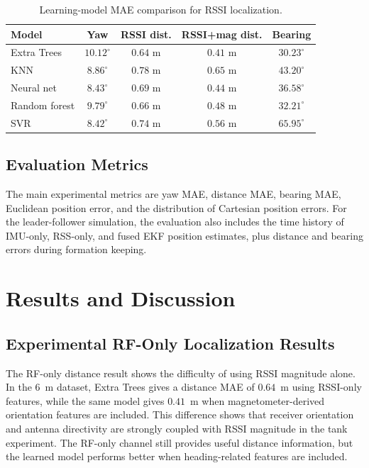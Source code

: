 \documentclass{uhcoethesis}
\begin{document}
\begin{table}[t]
    \centering
    \caption{Learning-model MAE comparison for RSSI localization.}
    \label{tab:ch5_model_comparison}
    \begin{tabular}{lcccc}

        \hline
        Model & Yaw & RSSI dist. & RSSI+mag dist.  & Bearing \\
        \hline
        Extra Trees & $10.12^\circ$ & $0.64$ m & $0.41$ m & $30.23^\circ$ \\
        KNN & $8.86^\circ$ & $0.78$ m & $0.65$ m & $43.20^\circ$ \\
        Neural net & $8.43^\circ$ & $0.69$ m & $0.44$ m & $36.58^\circ$ \\
        Random forest & $9.79^\circ$ & $0.66$ m & $0.48$ m & $32.21^\circ$ \\
        SVR & $8.42^\circ$ & $0.74$ m & $0.56$ m & $65.95^\circ$ \\
        \hline
    \end{tabular}
\end{table}

\subsection{Evaluation Metrics}

The main experimental metrics are yaw MAE, distance MAE, bearing MAE, Euclidean position error, and the distribution of Cartesian position errors. For the leader-follower simulation, the evaluation also includes the time history of IMU-only, RSS-only, and fused EKF position estimates, plus distance and bearing errors during formation keeping.

\section{Results and Discussion}
\label{sec:ch5_results_discussion}

\subsection{Experimental RF-Only Localization Results}

The RF-only distance result shows the difficulty of using RSSI magnitude alone. In the 6~m dataset, Extra Trees gives a distance MAE of $0.64$~m using RSSI-only features, while the same model gives $0.41$~m when magnetometer-derived orientation features are included. This difference shows that receiver orientation and antenna directivity are strongly coupled with RSSI magnitude in the tank experiment. The RF-only channel still provides useful distance information, but the learned model performs better when heading-related features are included.
\end{document}
